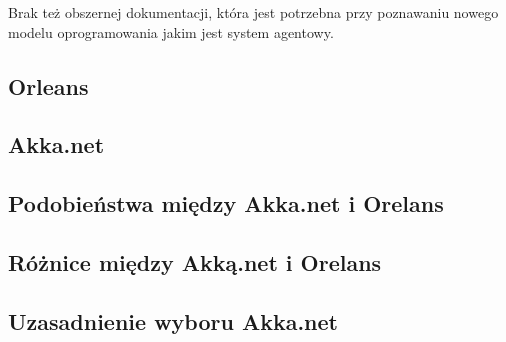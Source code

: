 Brak też obszernej dokumentacji, która jest potrzebna przy poznawaniu nowego modelu oprogramowania jakim jest system agentowy.

\subsection{Orleans}


\subsection{Akka.net}


\subsection{Podobieństwa między Akka.net i Orelans}


\subsection{Różnice między Akką.net i Orelans}


\subsection{Uzasadnienie wyboru Akka.net}